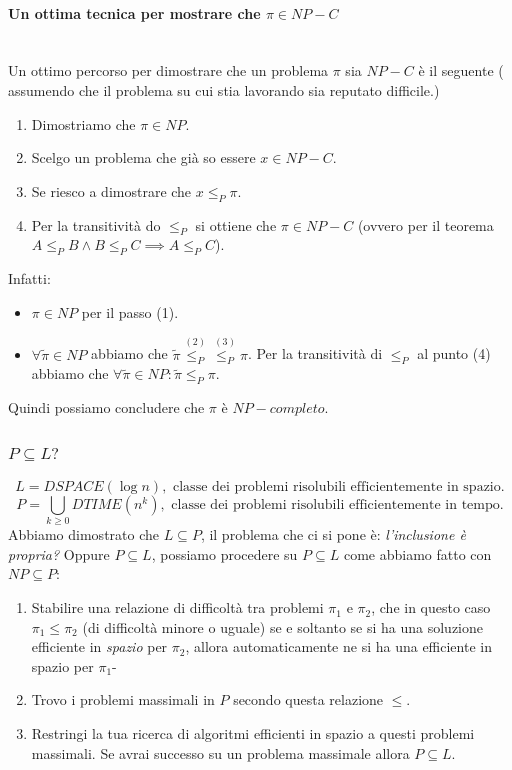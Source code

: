 \documentclass{article}
\begin{document}
\paragraph{Un ottima tecnica per mostrare che $\pi\in NP-C$}\mbox{}\\
Un ottimo percorso per dimostrare che un problema $\pi$ sia $NP-C$ è il seguente (
assumendo che il problema su cui stia lavorando sia reputato difficile.)
\begin{enumerate}
    \item Dimostriamo che $\pi\in NP$.
    \item Scelgo un problema che già so essere $x\in NP-C$.
    \item Se riesco a dimostrare che $x\leq_P \pi$.
    \item Per la transitività do $\leq_P$ si ottiene che $\pi\in NP-C$ (ovvero
          per il teorema $A\leq_P B\land B\leq_P C\implies A\leq_P C$).
\end{enumerate}
Infatti:
\begin{itemize}
    \item $\pi\in NP$ per il passo (1).
    \item $\forall\tilde{\pi}\in NP$ abbiamo che
          $\tilde{\pi}\overset{(2)}{\leq_P}\overset{(3)}{\leq_P}\pi$. Per la transitività
          di $\leq_P$ al punto (4) abbiamo che $\forall\tilde{\pi}\in NP:\tilde{\pi}\leq_P\pi$.
\end{itemize}
Quindi possiamo concludere che $\pi$ è $NP-completo$.

\subsubsection{$P\subseteq L?$}
$$L=DSPACE(\log n),\text{ classe dei problemi risolubili efficientemente in spazio.}$$
$$P=\bigcup_{k\geq 0}DTIME(n^k),\text{ classe dei problemi risolubili efficientemente in tempo.}$$
Abbiamo dimostrato che $L\subseteq P$, il problema che ci si pone è:\textit{ l'inclusione
    è propria?} Oppure $P\subseteq L$, possiamo procedere su $P\subseteq L$ come abbiamo
fatto con $NP\subseteq P$:
\begin{enumerate}
    \item Stabilire una relazione di difficoltà tra problemi $\pi_1$ e $\pi_2$, che in questo
          caso $\pi_1\leq\pi_2$ (di difficoltà minore o uguale) se e soltanto se si ha una
          soluzione efficiente in \textit{spazio} per $\pi_2$, allora automaticamente ne si ha
          una efficiente in spazio per $\pi_1$-

    \item Trovo i problemi massimali in $P$ secondo questa relazione $\leq$.

    \item Restringi la tua ricerca di algoritmi efficienti in spazio a questi problemi
          massimali. Se avrai successo su un problema massimale allora $P\subseteq L$.
\end{enumerate}
\end{document}
